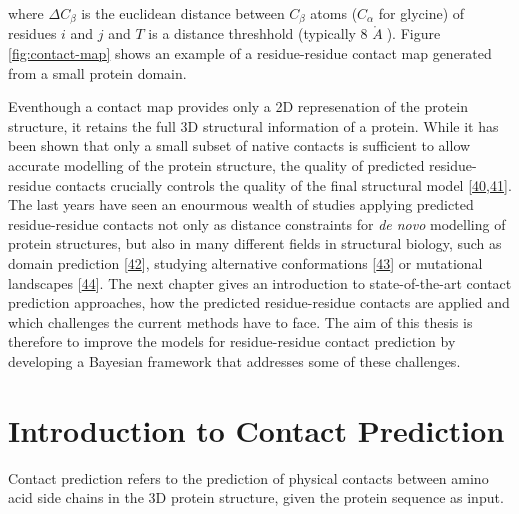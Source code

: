 \documentclass[11pt,a4paper,twoside]{book}
\newcommand{\Cb}{C_\beta}
\newcommand{\angstrom}{\mathring{A} \;}
\theoremstyle{definition}
\theoremstyle{definition}
\theoremstyle{remark}
\begin{document}
where \(\Delta \Cb\) is the euclidean distance between \(\Cb\) atoms
(\(C_\alpha\) for glycine) of residues \(i\) and \(j\) and \(T\) is a
distance threshhold (typically 8 \(\angstrom\)). Figure
\ref{fig:contact-map} shows an example of a residue-residue contact map
generated from a small protein domain.

Eventhough a contact map provides only a 2D represenation of the protein
structure, it retains the full 3D structural information of a protein.
While it has been shown that only a small subset of native contacts is
sufficient to allow accurate modelling of the protein structure, the
quality of predicted residue-residue contacts crucially controls the
quality of the final structural model
{[}\protect\hyperlink{ref-Kim2014}{40},\protect\hyperlink{ref-Duarte2010}{41}{]}.
The last years have seen an enourmous wealth of studies applying
predicted residue-residue contacts not only as distance constraints for
\emph{de novo} modelling of protein structures, but also in many
different fields in structural biology, such as domain prediction
{[}\protect\hyperlink{ref-Sadowski2013}{42}{]}, studying alternative
conformations {[}\protect\hyperlink{ref-Parisi2015a}{43}{]} or
mutational landscapes {[}\protect\hyperlink{ref-Hopf2017}{44}{]}. The
next chapter gives an introduction to state-of-the-art contact
prediction approaches, how the predicted residue-residue contacts are
applied and which challenges the current methods have to face. The aim
of this thesis is therefore to improve the models for residue-residue
contact prediction by developing a Bayesian framework that addresses
some of these challenges.

\chapter{Introduction to Contact
Prediction}\label{introduction-to-contact-prediction}

Contact prediction refers to the prediction of physical contacts between
amino acid side chains in the 3D protein structure, given the protein
sequence as input.
\end{document}
